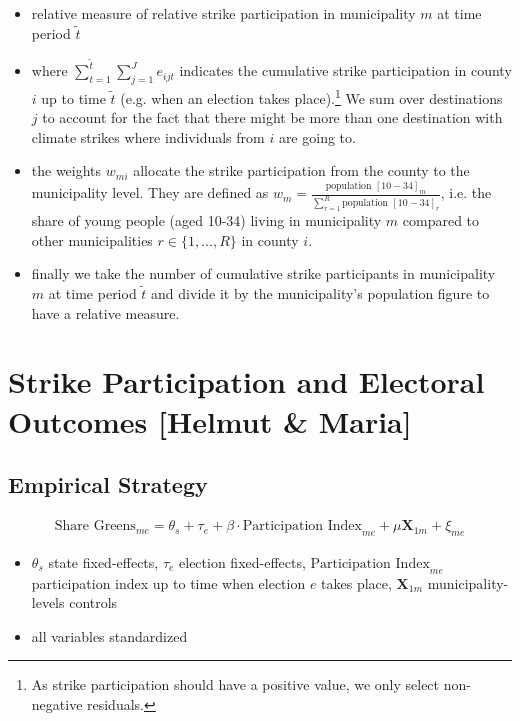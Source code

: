 \begin{itemize}
	\item relative measure of relative strike participation in municipality $m$ at time period $\tilde{t}$
	\item where $\sum_{t=1}^{\tilde{t}}\sum_{j=1}^{J} e_{ijt}$ indicates the cumulative strike participation in county $i$ up to time $\tilde{t}$ (e.g. when an election takes place).\footnote{As strike participation should have a positive value, we only select non-negative residuals.} We sum over destinations $j$ to account for the fact that there might be more than one destination with climate strikes where individuals from $i$ are going to.
	\item the weights $w_{mi}$ allocate the strike participation from the county to the municipality level. They are defined as $w_m=\tfrac{\text{population }[10-34]_m}{\sum_{r=1}^{R}\text{population }[10-34]_r}$, i.e. the share of young people (aged 10-34) living in municipality $m$ compared to other municipalities $r\in\{1,...,R\}$ in county $i$.
	\item finally we take the number of cumulative strike participants in municipality $m$ at time period $\tilde{t}$ and divide it by the municipality's population figure to have a relative measure.
\end{itemize}















\clearpage
\section{Strike Participation and Electoral Outcomes [Helmut \& Maria]}\label{sec_greta_cons:strike_participation_elections}
\subsection{Empirical Strategy}

\begin{align}
	\text{Share Greens}_{me} = \theta_s + \tau_e + \beta\cdot\text{Participation Index}_{me} + \mu \mathbf{X}_{1m} + \xi_{me}\label{eq_greta_cons:vote_share_greens}
\end{align}
\begin{itemize}
	\item $\theta_s$ state fixed-effects, $\tau_e$ election fixed-effects, $\text{Participation Index}_{me}$ participation index up to time when election $e$ takes place, $\mathbf{X}_{1m}$ municipality-levels controls 
	\item all variables standardized
\end{itemize}

